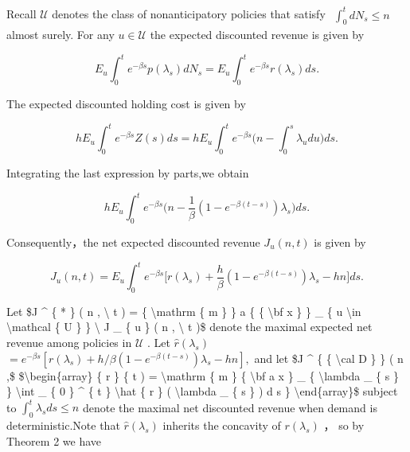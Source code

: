 Recall \(\mathcal { U }\) denotes the class of nonanticipatory policies
that satisfy
\(\begin{array} { r } { \int _ { 0 } ^ { t } d N _ { s } \le n } \end{array}\)
almost surely. For any \(u \in \mathcal { U }\) the expected discounted
revenue is given by

\[
E _ { u } \int _ { 0 } ^ { t } e ^ { - \beta s } p ( \lambda _ { s } ) d N _ { s } = E _ { u } \int _ { 0 } ^ { t } e ^ { - \beta s } r ( \lambda _ { s } ) d s .
\]

The expected discounted holding cost is given by

\[
h E _ { u } \int _ { 0 } ^ { t } e ^ { - \beta s } Z ( s ) d s = h E _ { u } \int _ { 0 } ^ { t } e ^ { - \beta s } \bigg ( n - \int _ { 0 } ^ { s } \lambda _ { u } d u \bigg ) d s .
\]

Integrating the last expression by parts,we obtain

\[
h E _ { u } \int _ { 0 } ^ { t } e ^ { - \beta s } \biggr ( n - \frac { 1 } { \beta } ( 1 - e ^ { - \beta ( t - s ) } ) \lambda _ { s } \biggr ) d s .
\]

Consequently，the net expected discounted revenue
\(J _ { u } ( n , t )\) is given by

\[
J _ { u } ( n , t ) = E _ { u } \int _ { 0 } ^ { t } e ^ { - \beta s } \Bigg [ r ( \lambda _ { s } ) + \frac { h } { \beta } ( 1 - e ^ { - \beta ( t - s ) } ) \lambda _ { s } - h n \Bigg ] d s .
\]

Let {\$J \^{} \{ * \} ( n , \textbackslash{} t ) = \{
\textbackslash mathrm \{ m \} \} a \{ \{ \textbackslash bf x \} \} \_ \{
u \textbackslash in \textbackslash mathcal \{ U \} \} \textbackslash{} J
\_ \{ u \} ( n , \textbackslash{} t )\$} denote the maximal expected net
revenue among policies in \(\mathcal { U }\) . Let
\(\hat { r } ( \lambda _ { s } )\)
\(= e ^ { - \beta s } [ r ( \lambda _ { s } ) + h / \beta ( 1 - e ^ { - \beta ( t - s ) } ) \lambda _ { s } - h n ] ,\)
and let {\$J \^{} \{ \{ \textbackslash cal D \} \} ( n ,\$}
{\$\textbackslash begin\{array\} \{ r \} \{ t ) = \textbackslash mathrm
\{ m \} \{ \textbackslash bf a x \} \_ \{ \textbackslash lambda \_ \{ s
\} \} \textbackslash int \_ \{ 0 \} \^{} \{ t \} \textbackslash hat \{ r
\} ( \textbackslash lambda \_ \{ s \} ) d s \}
\textbackslash end\{array\}\$} subject to
\(\textstyle \int _ { 0 } ^ { t } \lambda _ { s } d s \leq n\) denote
the maximal net discounted revenue when demand is deterministic.Note
that \(\hat { r } ( \lambda _ { s } )\) inherits the concavity of
\(r ( \lambda _ { s } )\) ， so by Theorem 2 we have


